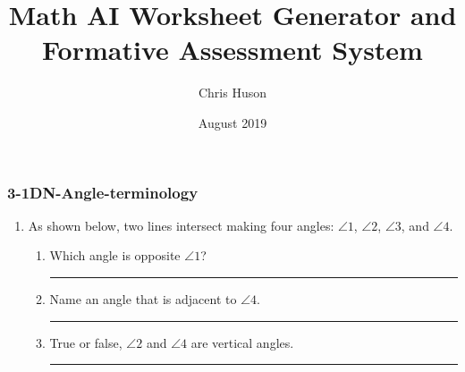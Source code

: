 \documentclass[12pt, twoside]{article}
\title{Math AI Worksheet Generator and Formative Assessment System}
\author{Chris Huson}
\date{August 2019}
\begin{document}
\subsubsection*{3-1DN-Angle-terminology}
\begin{enumerate}
\item As shown below, two lines intersect making four angles: $\angle 1$, $\angle 2$, $\angle 3$, and $\angle 4$.
    \begin{center}
    \end{center}
    \begin{enumerate}
    \item Which angle is opposite $\angle 1$? \rule{4cm}{0.15mm} \bigskip
    \item Name an angle that is adjacent to $\angle 4$. \rule{4cm}{0.15mm} \bigskip
    \item True or false, $\angle 2$ and $\angle 4$ are vertical angles. \rule{3cm}{0.15mm}
  \end{enumerate}


\end{enumerate}
\end{document}

